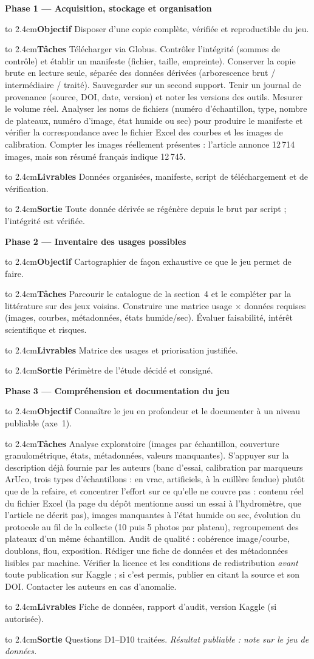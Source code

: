 \documentclass[11pt,a4paper]{article}
\newcommand{\phase}[2]{\par\bigskip\noindent\textbf{Phase #1 --- #2}\par\nopagebreak\smallskip}
\newcommand{\champ}[1]{\par\noindent\hangindent=2.4cm\hangafter=1\hbox to 2.4cm{\textbf{#1}\hfil}\ignorespaces}
\begin{document}
\phase{1}{Acquisition, stockage et organisation}
\champ{Objectif} Disposer d'une copie complète, vérifiée et reproductible du jeu.
\champ{Tâches} Télécharger via Globus. Contrôler l'intégrité (sommes de contrôle) et établir un manifeste (fichier, taille, empreinte). Conserver la copie brute en lecture seule, séparée des données dérivées (arborescence brut / intermédiaire / traité). Sauvegarder sur un second support. Tenir un journal de provenance (source, DOI, date, version) et noter les versions des outils. Mesurer le volume réel. Analyser les noms de fichiers (numéro d'échantillon, type, nombre de plateaux, numéro d'image, état humide ou sec) pour produire le manifeste et vérifier la correspondance avec le fichier Excel des courbes et les images de calibration. Compter les images réellement présentes : l'article annonce 12\,714 images, mais son résumé français indique 12\,745.
\champ{Livrables} Données organisées, manifeste, script de téléchargement et de vérification.
\champ{Sortie} Toute donnée dérivée se régénère depuis le brut par script ; l'intégrité est vérifiée.

\phase{2}{Inventaire des usages possibles}
\champ{Objectif} Cartographier de façon exhaustive ce que le jeu permet de faire.
\champ{Tâches} Parcourir le catalogue de la section~4 et le compléter par la littérature sur des jeux voisins. Construire une matrice usage $\times$ données requises (images, courbes, métadonnées, états humide/sec). Évaluer faisabilité, intérêt scientifique et risques.
\champ{Livrables} Matrice des usages et priorisation justifiée.
\champ{Sortie} Périmètre de l'étude décidé et consigné.

\phase{3}{Compréhension et documentation du jeu}
\champ{Objectif} Connaître le jeu en profondeur et le documenter à un niveau publiable (axe~1).
\champ{Tâches} Analyse exploratoire (images par échantillon, couverture granulométrique, états, métadonnées, valeurs manquantes). S'appuyer sur la description déjà fournie par les auteurs (banc d'essai, calibration par marqueurs ArUco, trois types d'échantillons : en vrac, artificiels, à la cuillère fendue) plutôt que de la refaire, et concentrer l'effort sur ce qu'elle ne couvre pas : contenu réel du fichier Excel (la page du dépôt mentionne aussi un essai à l'hydromètre, que l'article ne décrit pas), images manquantes à l'état humide ou sec, évolution du protocole au fil de la collecte (10 puis 5 photos par plateau), regroupement des plateaux d'un même échantillon. Audit de qualité : cohérence image/courbe, doublons, flou, exposition. Rédiger une fiche de données et des métadonnées lisibles par machine. Vérifier la licence et les conditions de redistribution \emph{avant} toute publication sur Kaggle ; si c'est permis, publier en citant la source et son DOI. Contacter les auteurs en cas d'anomalie.
\champ{Livrables} Fiche de données, rapport d'audit, version Kaggle (si autorisée).
\champ{Sortie} Questions D1--D10 traitées. \emph{Résultat publiable : note sur le jeu de données.}
\end{document}

